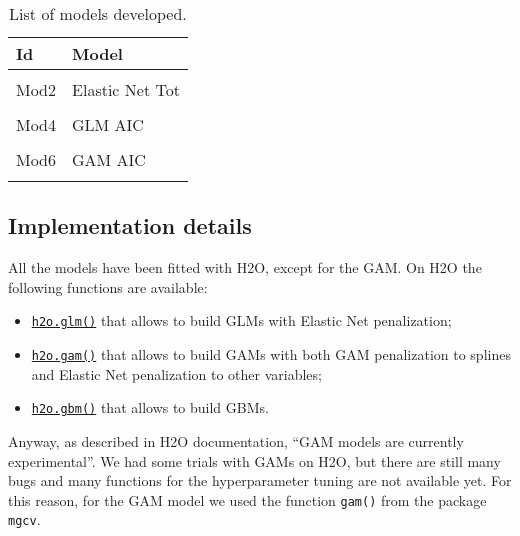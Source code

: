 \documentclass[a4paper, twoside, openright, 12pt]{report}
\providecommand{\tightlist}{%
  \setlength{\itemsep}{0pt}\setlength{\parskip}{0pt}}
\theoremstyle{definition}
\theoremstyle{definition}
\theoremstyle{definition}
\theoremstyle{remark}
\begin{document}
\begin{table}[!h]

\caption{\label{tab:models-list}List of models developed.}
\centering
\begin{tabular}[t]{ll}
\toprule
\textbf{Id} & \textbf{Model}\\
\midrule[\heavyrulewidth]
\cellcolor{gray!6}{Mod1} & \cellcolor{gray!6}{GLM Tot}\\
Mod2 & Elastic Net Tot\\
\cellcolor{gray!6}{Mod3} & \cellcolor{gray!6}{Ridge Tot}\\
Mod4 & GLM AIC\\
\cellcolor{gray!6}{Mod5} & \cellcolor{gray!6}{Elastic Net AIC}\\
Mod6 & GAM AIC\\
\cellcolor{gray!6}{Mod7} & \cellcolor{gray!6}{GBM Tot}\\
\bottomrule
\end{tabular}
\end{table}

\hypertarget{implementation-details}{%
\subsection{Implementation details}\label{implementation-details}}

All the models have been fitted with H2O, except for the GAM. On H2O the following functions are available:

\begin{itemize}
\tightlist
\item
  \href{http://docs.h2o.ai/h2o/latest-stable/h2o-docs/data-science/glm.html}{\texttt{h2o.glm()}} that allows to build GLMs with Elastic Net penalization;
\item
  \href{http://docs.h2o.ai/h2o/latest-stable/h2o-docs/data-science/gam.html}{\texttt{h2o.gam()}} that allows to build GAMs with both GAM penalization to splines and Elastic Net penalization to other variables;
\item
  \href{http://docs.h2o.ai/h2o/latest-stable/h2o-docs/data-science/gbm.html}{\texttt{h2o.gbm()}} that allows to build GBMs.
\end{itemize}

Anyway, as described in H2O documentation, ``GAM models are currently experimental''. We had some trials with GAMs on H2O, but there are still many bugs and many functions for the hyperparameter tuning are not available yet. For this reason, for the GAM model we used the function \texttt{gam()} from the package \texttt{mgcv}.
\end{document}
